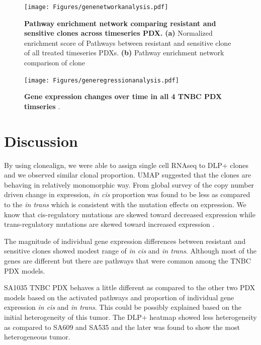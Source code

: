 \begin{figure}
\centering
  \texttt{[image: Figures/genenetworkanalysis.pdf]}
\caption[DE of resistant and sensitive clonealign defined clones]
	{\small
	\textbf{Pathway enrichment network comparing resistant and sensitive clones across timeseries PDX.}
	\textbf{(a)} Normalized enrichment score of Pathways between resistant and sensitive clone of all treated timeseries PDXs.
	    \textbf{(b)} Pathway enrichment network comparison of clone }
		\label{fig:genenetworkanalysis}
\end{figure}









\begin{figure}
\centering
 \texttt{[image: Figures/generegressionanalysis.pdf]}
	
\caption[Gene expression changes over time]
	{\small
	 \textbf{Gene expression changes over time in all 4 TNBC PDX timseries} .
	}
	\label{fig:generegressionanalysis}
\end{figure}



\section{Discussion}

By using clonealign, we were able to assign single cell RNAseq to  DLP+ clones and we observed similar clonal proportion. UMAP suggested that the clones are behaving in relatively monomorphic way. From global survey of the copy number driven change in expression, \textit{in cis} proportion was found to be less as compared to the \textit{in trans} which is consistent with the mutation effects on expression. We know that cis-regulatory mutations are skewed toward decreased expression while trans-regulatory mutations are skewed toward increased expression \cite{metzger2016contrasting}.

The magnitude of individual gene expression differences between resistant and sensitive clones showed modest range of \textit{in cis} and \textit{in trans}. Although most of the genes are different but there are pathways that were common among the TNBC PDX models. 

SA1035 TNBC PDX behaves a little different as compared to the other two PDX models based on the activated pathways and proportion of individual gene expression \textit{in cis} and \textit{in trans}. This could be possibly explained based on the initial heterogeneity of this tumor. The DLP+ heatmap showed less heterogeneity as compared to SA609 and SA535 and the later was found to show the most heterogeneous tumor.

